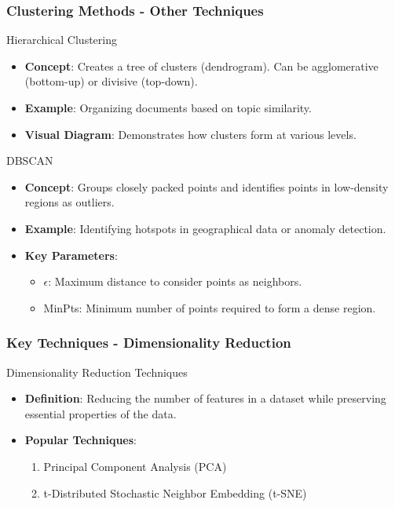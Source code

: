 \documentclass[aspectratio=169]{beamer}
\begin{document}
\begin{frame}
    \frametitle{Clustering Methods - Other Techniques}
    \begin{block}{Hierarchical Clustering}
        \begin{itemize}
            \item \textbf{Concept}: Creates a tree of clusters (dendrogram). Can be agglomerative (bottom-up) or divisive (top-down).
            \item \textbf{Example}: Organizing documents based on topic similarity.
            \item \textbf{Visual Diagram}: Demonstrates how clusters form at various levels.
        \end{itemize}
    \end{block}
    
    \begin{block}{DBSCAN}
        \begin{itemize}
            \item \textbf{Concept}: Groups closely packed points and identifies points in low-density regions as outliers.
            \item \textbf{Example}: Identifying hotspots in geographical data or anomaly detection.
            \item \textbf{Key Parameters}:
                \begin{itemize}
                    \item \( \epsilon \): Maximum distance to consider points as neighbors.
                    \item MinPts: Minimum number of points required to form a dense region.
                \end{itemize}
        \end{itemize}
    \end{block}
\end{frame}

\begin{frame}
    \frametitle{Key Techniques - Dimensionality Reduction}
    \begin{block}{Dimensionality Reduction Techniques}
        \begin{itemize}
            \item \textbf{Definition}: Reducing the number of features in a dataset while preserving essential properties of the data.
            \item \textbf{Popular Techniques}:
                \begin{enumerate}
                    \item Principal Component Analysis (PCA)
                    \item t-Distributed Stochastic Neighbor Embedding (t-SNE)
                \end{enumerate}
        \end{itemize}
    \end{block}
\end{frame}
\end{document}
